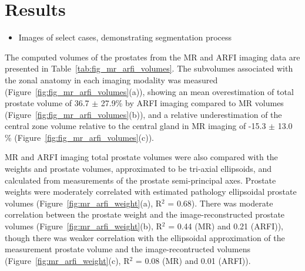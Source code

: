 \section{Results}\label{sect:results}

\begin{itemize}
    \item Images of select cases, demonstrating segmentation process
\end{itemize}

The computed volumes of the prostates from the MR and ARFI imaging data are
presented in Table~\ref{tab:fig_mr_arfi_volumes}.  The subvolumes associated
with the zonal anatomy in each imaging modality was measured
(Figure~\ref{fig:fig_mr_arfi_volumes}(a)), showing an mean overestimation of
total prostate volume of 36.7 $\pm$ 27.9\% by ARFI imaging compared to MR
volumes (Figure~\ref{fig:fig_mr_arfi_volumes}(b)), and a relative
underestimation of the central zone volume relative to the central gland in MR
imaging of -15.3 $\pm$ 13.0 \% (Figure~\ref{fig:fig_mr_arfi_volumes}(c)).





MR and ARFI imaging total prostate volumes were also compared with the weights
and prostate volumes, approximated to be tri-axial ellipsoids, and calculated
from measurements of the prostate semi-principal axes.  Prostate weights were
moderately correlated with estimated pathology ellipsoidal prostate volumes
(Figure~\ref{fig:mr_arfi_weight}(a), R$^2$ = 0.68).  There was moderate
correlation between the prostate weight and the image-reconstructed prostate
volumes (Figure~\ref{fig:mr_arfi_weight}(b), R$^2$ = 0.44 (MR) and 0.21
(ARFI)), though there was weaker correlation with the ellipsoidal approximation
of the measurement prostate volume and the image-recontructed volumens
(Figure~\ref{fig:mr_arfi_weight}(c), R$^2$ = 0.08 (MR) and 0.01 (ARFI)).  




